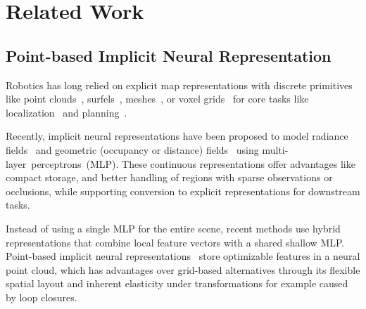 \section{Related Work}
\label{sec:related}



\subsection{Point-based Implicit Neural Representation}


Robotics has long relied on explicit map representations with discrete primitives like point clouds~\cite{zhang2014rss}, surfels~\cite{whelan2015rss, behley2018rss}, meshes~\cite{vizzo2021icra}, or voxel grids~\cite{hornung2013ar,newcombe2011ismar} for core tasks like localization~\cite{thrun2001ai} and planning~\cite{stachniss2005rss}.
%

Recently, implicit neural representations have been proposed to model radiance fields~\cite{mildenhall2020eccv} and geometric (occupancy or distance) fields~\cite{mescheder2019cvpr, park2019cvpr, ortiz2022rss} using \mbox{multi-layer perceptrons (MLP)}. 
%
These continuous representations offer advantages like compact storage, and better handling of regions with sparse observations or occlusions, while supporting conversion to explicit representations for downstream tasks.
%

Instead of using a single MLP for the entire scene, recent methods use hybrid representations that combine local feature vectors with a shared shallow MLP.
Point-based implicit neural representations~\cite{xu2022cvpr-pointnerf, pan2024tro-pin} store optimizable features in a neural point cloud, which has advantages over grid-based alternatives through its flexible spatial layout and inherent elasticity under transformations for example caused by loop closures.
%

